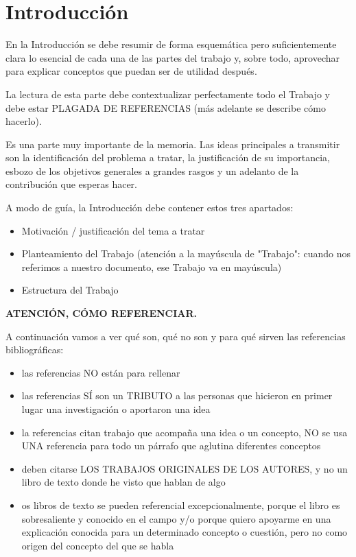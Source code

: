 \documentclass[11pt,a4paper,spanish]{book}
\begin{document}
\mainmatter

\chapter{Introducción}

En la Introducción se debe resumir de forma esquemática pero suficientemente clara lo esencial de cada una de las partes del trabajo y, sobre todo, aprovechar para explicar conceptos que puedan ser de utilidad después. 
\newline

La lectura de esta parte debe contextualizar perfectamente todo el Trabajo y debe estar PLAGADA DE REFERENCIAS (más adelante se describe cómo hacerlo).
\newline

Es una parte muy importante de la memoria. Las ideas principales a transmitir son la identificación del problema a tratar, la justificación de su importancia, esbozo de los objetivos generales a grandes rasgos y un adelanto de la contribución que esperas hacer.

A modo de guía, la Introducción debe contener estos tres apartados:
\begin{itemize}
\item Motivación / justificación del tema a tratar
\item Planteamiento del Trabajo (atención a la mayúscula de "Trabajo": cuando nos referimos a nuestro documento, ese Trabajo va en mayúscula)
\item Estructura del Trabajo
\end{itemize}

\vspace{1cm}
{\bf{ATENCIÓN, CÓMO REFERENCIAR.}}

A continuación vamos a ver qué son, qué no son y para qué  sirven las referencias bibliográficas:
\begin{itemize}
	\item las referencias NO están para rellenar
	\item las referencias SÍ son un TRIBUTO a las personas que hicieron en primer lugar una investigación o aportaron una idea
	\item la referencias citan trabajo que acompaña una idea o un concepto, NO se usa UNA referencia para todo un párrafo que aglutina diferentes conceptos
	\item deben citarse LOS TRABAJOS ORIGINALES DE LOS AUTORES, y no un libro de texto donde he visto que hablan de algo
	\item os libros de texto se pueden referencial excepcionalmente, porque el libro es sobresaliente y conocido en el campo y/o porque quiero apoyarme en una explicación conocida para un determinado concepto o cuestión, pero no como origen del concepto del que se habla
\end{itemize}
\end{document}
